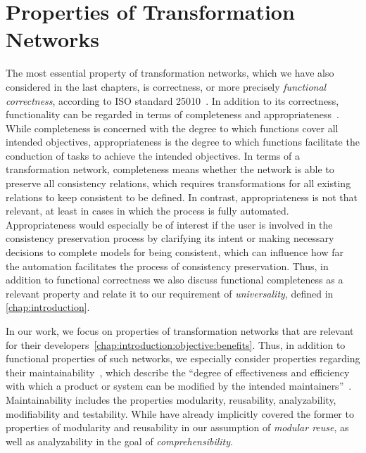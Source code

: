\section{Properties of Transformation Networks}
\label{chap:classification:properties}

The most essential property of transformation networks, which we have also considered in the last chapters, is correctness, or more precisely \emph{functional correctness}, according to ISO standard 25010~\cite{iso25010}.
In addition to its correctness, functionality can be regarded in terms of completeness and appropriateness~\cite{iso25010}.
While completeness is concerned with the degree to which functions cover all intended objectives, appropriateness is the degree to which functions facilitate the conduction of tasks to achieve the intended objectives.
In terms of a transformation network, completeness means whether the network is able to preserve all consistency relations, which requires transformations for all existing relations to keep consistent to be defined.
In contrast, appropriateness is not that relevant, at least in cases in which the process is fully automated. Appropriateness would especially be of interest if the user is involved in the consistency preservation process by clarifying its intent or making necessary decisions to complete models for being consistent, which can influence how far the automation facilitates the process of consistency preservation.
Thus, in addition to functional correctness we also discuss functional completeness as a relevant property and relate it to our requirement of \emph{universality}, defined in \autoref{chap:introduction}.

In our work, we focus on properties of transformation networks that are relevant for their developers~\autoref{chap:introduction:objective:benefits}.
Thus, in addition to functional properties of such networks, we especially consider properties regarding their maintainability~\cite[Tab.\ 2]{iso25010}, which describe the \enquote{degree of effectiveness and efficiency with which a product or system can be modified by the intended maintainers}~\cite[p.\ 14]{iso25010}.
Maintainability includes the properties modularity, reusability, analyzability, modifiability and testability.
While have already implicitly covered the former to properties of modularity and reusability in our assumption of \emph{modular reuse}, as well as analyzability in the goal of \emph{comprehensibility}.


